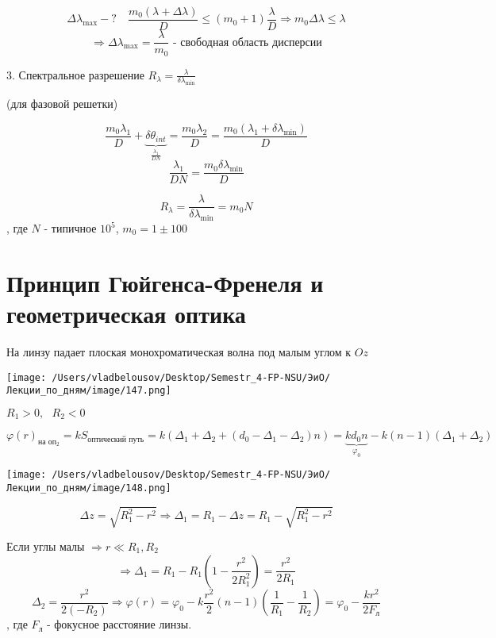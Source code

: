 \documentclass[12pt, a4paper]{report}
\begin{document}
\[ \Delta \lambda _{\max  } - ? \quad  \frac{ m_0 (\lambda + \Delta \lambda )}{D }  \le  (m_0 +1 ) \frac{\lambda}{D }  \Rightarrow m_0 \Delta \lambda  \le  \lambda    \] 
\[ \Rightarrow \Delta \lambda _{ \max  } = \frac{\lambda}{m_0 } \text{ - свободная область дисперсии}  \] 

3. Спектральное разрешение \( \displaystyle  R_{\lambda } = \frac{\lambda}{\delta \lambda_{ \min  } }   \) 

(для фазовой решетки)

\[ \frac{m_0 \lambda_1 }{D } +\underbrace{ \delta \theta_{ int }}_{\frac{\lambda_1 }{D N} } = \frac{ m_0 \lambda_2 }{D } = \frac{m_0 (\lambda_1 + \delta \lambda_{ \min  } )}{ D}     \] 
\[ \frac{\lambda_1}{D N }  = \frac{m_0 \delta \lambda_{ \min  } }{D }  \] 

\[ R_{\lambda } = \frac{\lambda}{\delta \lambda_{ \min  } } = m_0 N   \] 
, где \( N \) - типичное \( 10^5 \), \( m_0 = 1 \pm 100 \) 

\section{Принцип Гюйгенса-Френеля и геометрическая оптика}

На линзу падает плоская монохроматическая волна под малым углом к \( Oz \) 

\begin{center}
    \texttt{[image: /Users/vladbelousov/Desktop/Semestr\_4-FP-NSU/ЭиО/Лекции\_по\_дням/image/147.png]}
\end{center}
\( R_1 >0 ,\text{ }  R_2 <0 \) 

\[ \varphi (r ) _{\text{на оп}_2 } = k S_{\text{оптический путь} }   = k (\Delta_1 + \Delta_2 + (d_0 - \Delta_1 - \Delta_2 )n ) =\underbrace{ k d_0 n}_{\varphi_0} - k (n-1 ) (\Delta_1 + \Delta_2 ) \] 

\begin{center}
    \texttt{[image: /Users/vladbelousov/Desktop/Semestr\_4-FP-NSU/ЭиО/Лекции\_по\_дням/image/148.png]}
\end{center}

\[ \Delta z = \sqrt{R_1 ^2 - r ^2 } \Rightarrow \Delta_1 = R_1 - \Delta z = R_1 - \sqrt{R_1 ^2 - r ^2 }  \] 

Если углы малы \(\Rightarrow r \ll R_1 ,R_2   \) 
\[ \Rightarrow \Delta_1 = R_1 - R_1 \left( 1 - \frac{r ^2 }{2 R_1 ^2 }  \right) = \frac{ r ^2 }{2 R_1 }  \] 
\[ \Delta_2 = \frac{ r ^2 }{2 (- R_2 )} \Rightarrow \varphi(r ) = \varphi_0 - k \frac{ r ^2 }{2 } (n-1 ) \left( \frac{1}{R_1 } - \frac{1}{R_2}   \right)  = \varphi_0 - \frac{k r ^2 }{2 F_{\text{л} } }    \] 
, где \( F_{\text{л} }  \) - фокусное расстояние линзы. 
\end{document}
